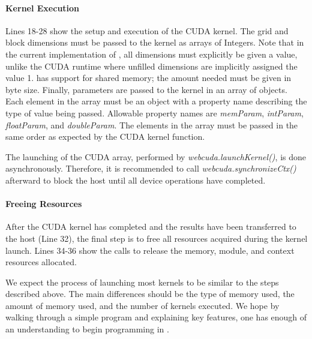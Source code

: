 \paragraph{Kernel Execution} Lines 18-28 show the setup and execution of the
CUDA kernel. The grid and block dimensions must be passed to the kernel as
arrays of Integers. Note that in the current implementation of \namens, all
dimensions must explicitly be given a value, unlike the CUDA runtime where
unfilled dimensions are implicitly assigned the value 1. \name has support for
shared memory; the amount needed must be given in byte size. Finally, parameters
are passed to the kernel in an array of objects. Each element in the array must
be an object with a property name describing the type of value being passed.
Allowable property names are \textit{memParam}, \textit{intParam},
\textit{floatParam}, and \textit{doubleParam}. The elements in the array must be
passed in the same order as expected by the CUDA kernel function.

The launching of the CUDA array, performed by \textit{webcuda.launchKernel()}, is
done asynchronously. Therefore, it is recommended to call
\textit{webcuda.synchronizeCtx()} afterward to block the host until all device operations
have completed.

\paragraph{Freeing Resources}
After the CUDA kernel has completed and the results have been transferred to the
host (Line 32), the final step is to free all resources acquired during the
kernel launch. Lines 34-36 show the \name calls to release the memory, module,
and context resources allocated.


We expect the process of launching most kernels to be similar to the steps
described above.  The main differences should be the type of memory used, the
amount of memory used, and the number of kernels executed. We hope by walking
through a simple program and explaining key \name features, one has enough of an
understanding to begin programming in \namens.

